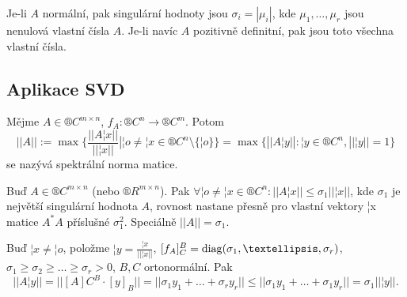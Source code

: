 \documentclass[12pt]{article}                   %
\begin{document}
        \begin{pozorovani}
            Je-li $A$ normální, pak singulární hodnoty jsou $\sigma_i = |\mu_i|$, kde $\mu_1, …, \mu_r$ jsou nenulová vlastní čísla $A$. Je-li navíc $A$ pozitivně definitní, pak jsou toto všechna vlastní čísla.
        \end{pozorovani}

    \subsection{Aplikace SVD}
        \begin{definice}
            Mějme $A \in ®C^{m \times n}$, $f_A: ®C^n \rightarrow ®C^m$. Potom
            $$ ||A|| := \max\{\frac{||A¦x||}{||¦x||} | ¦o ≠ ¦x \in ®C^n \setminus \{¦o\}\} = \max\{||A¦y|| : ¦y \in ®C^n, ||¦y|| = 1\} $$
            se nazývá spektrální norma matice.
        \end{definice}

        \begin{tvrzeni}
            Buď $A \in ®C^{m \times n}$ (nebo $®R^{m \times n}$). Pak $\forall ¦o ≠ ¦x \in ®C^n: ||A¦x|| ≤ \sigma_1||¦x||$, kde $\sigma_1$ je největší singulární hodnota $A$, rovnost nastane přesně pro vlastní vektory ¦x matice $A^*A$ příslušné $\sigma_1^2$. Speciálně $||A|| = \sigma_1$.

            \begin{dukazin}
                Buď $¦x ≠ ¦o$, položme $¦y = \frac{¦x}{||¦x||}$, $[f_A]_C^B = \diag(\sigma_1, …, \sigma_r)$, $\sigma_1 ≥ \sigma_2 ≥ … ≥ \sigma_r > 0$, $B, C$ ortonormální. Pak
                $$ ||A¦y|| = ||[A]C^B·[y]_B|| = ||\sigma_1y_1 + … + \sigma_ry_r|| ≤ ||\sigma_1y_1 + … + \sigma_1y_r|| = \sigma_1||¦y||. $$ 
            \end{dukazin}
        \end{tvrzeni}
\end{document}
